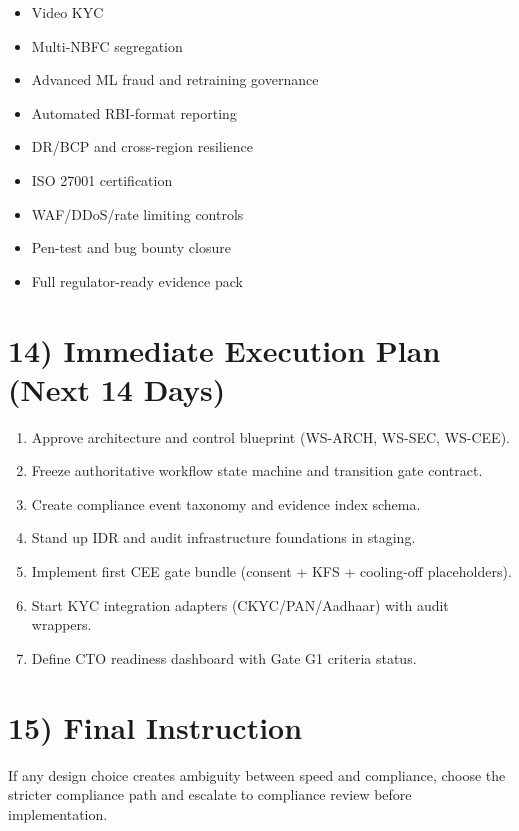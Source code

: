 ﻿\documentclass[12pt]{article}
\begin{document}
\begin{itemize}
\item Video KYC
\item Multi-NBFC segregation
\item Advanced ML fraud and retraining governance
\item Automated RBI-format reporting
\item DR/BCP and cross-region resilience
\item ISO 27001 certification
\item WAF/DDoS/rate limiting controls
\item Pen-test and bug bounty closure
\item Full regulator-ready evidence pack
\end{itemize}

\section{14) Immediate Execution Plan (Next 14 Days)}


\begin{enumerate}
\item Approve architecture and control blueprint (WS-ARCH, WS-SEC, WS-CEE).
\item Freeze authoritative workflow state machine and transition gate contract.
\item Create compliance event taxonomy and evidence index schema.
\item Stand up IDR and audit infrastructure foundations in staging.
\item Implement first CEE gate bundle (consent + KFS + cooling-off placeholders).
\item Start KYC integration adapters (CKYC/PAN/Aadhaar) with audit wrappers.
\item Define CTO readiness dashboard with Gate G1 criteria status.
\end{enumerate}

\section{15) Final Instruction}


If any design choice creates ambiguity between speed and compliance, choose the stricter compliance path and escalate to compliance review before implementation.
\end{document}

